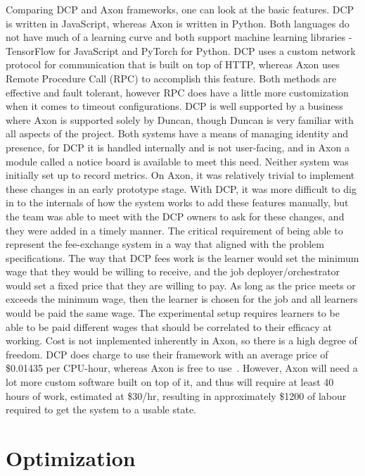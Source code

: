 \documentclass[../mthe-493-final-project.tex]{subfiles}
\begin{document}
    Comparing DCP and Axon frameworks, one can look at the basic features. DCP is written in JavaScript, whereas Axon is written in Python. Both languages do not have much of a learning curve and both support machine learning libraries - TensorFlow for JavaScript and PyTorch for Python. DCP uses a custom network protocol for communication that is built on top of HTTP, whereas Axon uses Remote Procedure Call (RPC) to accomplish this feature. Both methods are effective and fault tolerant, however RPC does have a little more customization when it comes to timeout configurations. DCP is well supported by a business where Axon is supported solely by Duncan, though Duncan is very familiar with all aspects of the project. Both systems have a means of managing identity and presence, for DCP it is handled internally and is not user-facing, and in Axon a module called a notice board is available to meet this need. Neither system was initially set up to record metrics. On Axon, it was relatively trivial to implement these changes in an early prototype stage. With DCP, it was more difficult to dig in to the internals of how the system works to add these features manually, but the team was able to meet with the DCP owners to ask for these changes, and they were added in a timely manner. The critical requirement of being able to represent the fee-exchange system in a way that aligned with the problem specifications. The way that DCP fees work is the learner would set the minimum wage that they would be willing to receive, and the job deployer/orchestrator would set a fixed price that they are willing to pay. As long as the price meets or exceeds the minimum wage, then the learner is chosen for the job and all learners would be paid the same wage. The experimental setup requires learners to be able to be paid different wages that should be correlated to their efficacy at working. Cost is not implemented inherently in Axon, so there is a high degree of freedom. DCP does charge to use their framework with an average price of \$0.01435 per CPU-hour, whereas Axon is free to use~\cite{kings-ds-marketing}. However, Axon will need a lot more custom software built on top of it, and thus will require at least 40 hours of work, estimated at \$30/hr, resulting in approximately \$1200 of labour required to get the system to a usable state. 

    \section{Optimization}
    \label{sec:optimization-engineering-tools}
    
\end{document}
